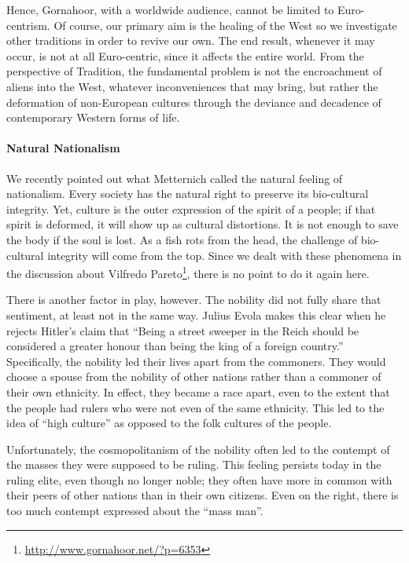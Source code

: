 Hence, Gornahoor, with a worldwide audience, cannot be limited to Euro-centrism. Of course, our primary aim is the healing of the West so we investigate other traditions in order to revive our own. The end result, whenever it may occur, is not at all Euro-centric, since it affects the entire world. From the perspective of Tradition, the fundamental problem is not the encroachment of aliens into the West, whatever inconveniences that may bring, but rather the deformation of non-European cultures through the deviance and decadence of contemporary Western forms of life.

\paragraph{Natural Nationalism}


We recently pointed out what Metternich called the natural feeling of nationalism. Every society has the natural right to preserve its bio-cultural integrity. Yet, culture is the outer expression of the spirit of a people; if that spirit is deformed, it will show up as cultural distortions. It is not enough to save the body if the soul is lost. As a fish rots from the head, the challenge of bio-cultural integrity will come from the top. Since we dealt with these phenomena in the discussion about Vilfredo Pareto\footnote{\url{http://www.gornahoor.net/?p=6353}}, there is no point to do it again here.

There is another factor in play, however. The nobility did not fully share that sentiment, at least not in the same way. Julius Evola makes this clear when he rejects Hitler's claim that ``Being a street sweeper in the Reich should be considered a greater honour than being the king of a foreign country.'' Specifically, the nobility led their lives apart from the commoners. They would choose a spouse from the nobility of other nations rather than a commoner of their own ethnicity. In effect, they became a race apart, even to the extent that the people had rulers who were not even of the same ethnicity. This led to the idea of ``high culture'' as opposed to the folk cultures of the people.

Unfortunately, the cosmopolitanism of the nobility often led to the contempt of the masses they were supposed to be ruling. This feeling persists today in the ruling elite, even though no longer noble; they often have more in common with their peers of other nations than in their own citizens. Even on the right, there is too much contempt expressed about the ``mass man''.

